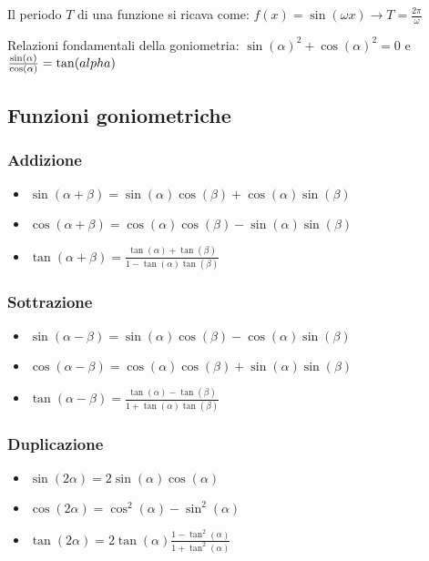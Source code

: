 Il periodo $T$ di una funzione si ricava come: $f(x)=\sin(\omega x) \rightarrow T=\frac{2\pi}{\omega}$

Relazioni fondamentali della goniometria: $\sin(\alpha)^2 + \cos(\alpha)^2 = 0$ e $\frac{\sin(\alpha)}{\cos(\alpha)} = \tan(\\alpha)$

\subsection{Funzioni goniometriche}

\subsubsection*{Addizione}

\begin{itemize}
    \item $\sin(\alpha+\beta)=\sin(\alpha)\cos(\beta)+\cos(\alpha)\sin(\beta)$
    \item $\cos(\alpha+\beta)=\cos(\alpha)\cos(\beta)-\sin(\alpha)\sin(\beta)$
    \item $\tan(\alpha+\beta)=\frac{\tan(\alpha)+\tan(\beta)}{1-\tan(\alpha)\tan(\beta)}$
\end{itemize}

\subsubsection*{Sottrazione}

\begin{itemize}
    \item $\sin(\alpha-\beta)=\sin(\alpha)\cos(\beta)-\cos(\alpha)\sin(\beta)$
    \item $\cos(\alpha-\beta)=\cos(\alpha)\cos(\beta)+\sin(\alpha)\sin(\beta)$
    \item $\tan(\alpha-\beta)=\frac{\tan(\alpha)-\tan(\beta)}{1+\tan(\alpha)\tan(\beta)}$
\end{itemize}

\subsubsection*{Duplicazione}

\begin{itemize}
    \item $\sin(2\alpha)=2\sin(\alpha)\cos(\alpha)$
    \item $\cos(2\alpha)=\cos^2(\alpha)-\sin^2(\alpha)$
    \item $\tan(2\alpha)=2\tan(\alpha)\frac{1-\tan^2(\alpha)}{1+\tan^2(\alpha)}$
\end{itemize}

